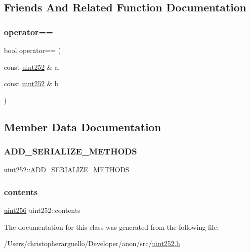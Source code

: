 \subsection{Friends And Related Function Documentation}
\mbox{\label{classuint252_a4fbc20c56fe58943428d789f1495dbbd}} 
\subsubsection{\texorpdfstring{operator==}{operator==}}
{\footnotesize\ttfamily bool operator== (\begin{DoxyParamCaption}\item[{const \mbox{\hyperlink{classuint252}{uint252}} \&}]{a,  }\item[{const \mbox{\hyperlink{classuint252}{uint252}} \&}]{b }\end{DoxyParamCaption})\hspace{0.3cm}{\ttfamily [friend]}}



\subsection{Member Data Documentation}
\mbox{\label{classuint252_aa85cac05ed076c3c3f9096371f4b5529}} 
\subsubsection{\texorpdfstring{A\+D\+D\+\_\+\+S\+E\+R\+I\+A\+L\+I\+Z\+E\+\_\+\+M\+E\+T\+H\+O\+DS}{ADD\_SERIALIZE\_METHODS}}
{\footnotesize\ttfamily uint252\+::\+A\+D\+D\+\_\+\+S\+E\+R\+I\+A\+L\+I\+Z\+E\+\_\+\+M\+E\+T\+H\+O\+DS}

\mbox{\label{classuint252_a2b9583b22a7e40620e65dd05d68e6ebf}} 
\subsubsection{\texorpdfstring{contents}{contents}}
{\footnotesize\ttfamily \mbox{\hyperlink{classuint256}{uint256}} uint252\+::contents\hspace{0.3cm}{\ttfamily [private]}}



The documentation for this class was generated from the following file\+:\begin{DoxyCompactItemize}
\item 
/\+Users/christopherarguello/\+Developer/anon/src/\mbox{\hyperlink{uint252_8h}{uint252.\+h}}\end{DoxyCompactItemize}
